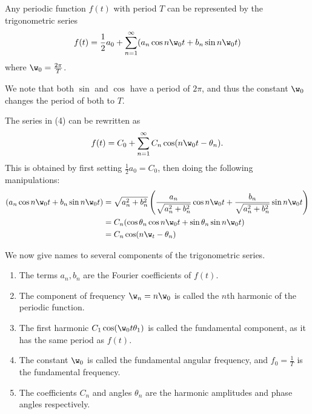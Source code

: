 \begin{thm} Any periodic function $f(t)$ with period $T$ can be represented by the trigonometric series
\begin{equation} f(t)=\frac{1}{2} a_0+\sum_{n=1}^\infty (a_n\cos n\w_0t+b_n\sin n\w_0t)
\end{equation} where $\w_0=\frac{2\pi}{T}$. \end{thm}

\begin{rem} We note that both $\sin$ and $\cos$ have a period of $2\pi$, and thus the constant $\w_0$ changes the period of both to $T$. \end{rem}

\begin{rem} The series in (4) can be rewritten as
\begin{equation}
f(t)=C_0+\sum_{n=1}^\infty C_n\cos(n\w_0t-\theta_n).
\end{equation} This is obtained by first setting $\frac12a_0=C_0$, then doing the following manipulations: \begin{equation} \begin{split}
(a_n\cos n\w_0t+b_n\sin n\w_0t) &=\sqrt{a_n^2+b_n^2}\left(\frac{a_n}{\sqrt{a_n^2+b_n^2}}\cos n\w_0t+\frac{b_n}{\sqrt{a_n^2+b_n^2}}\sin n\w_0t\right) \\ &= C_n(\cos\theta_n\cos n\w_0t+\sin\theta_n\sin n\w_0t) \\ &= C_n\cos(n\w_t-\theta_n)
\end{split} 
\end{equation} \end{rem}

\begin{defn} We now give names to several components of the trigonometric series.
\begin{enumerate}
	\item The terms $a_n,b_n$ are the Fourier coefficients of $f(t)$.
	\item The component of frequency $\w_n=n\w_0$ is called the $n$th harmonic of the periodic function.
	\item The first harmonic $C_1\cos(\w_0t\theta_1)$ is called the fundamental component, as it has the same period as $f(t)$.
	\item The constant $\w_0$ is called the fundamental angular frequency, and $f_0=\frac1T$ is the fundamental frequency.
	\item The coefficients $C_n$ and angles $\theta_n$ are the harmonic amplitudes and phase angles respectively.
\end{enumerate} \end{defn}

